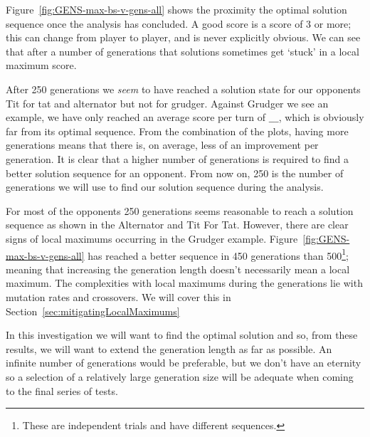Figure~\ref{fig:GENS-max-bs-v-gens-all} shows the proximity the optimal solution sequence once the analysis has concluded.
A good score is a score of 3 or more;
this can change from player to player, and is never explicitly obvious.
We can see that after a number of generations that solutions sometimes get `stuck' in a local maximum score.


After 250 generations we \textit{seem} to have reached a solution state for our opponents Tit for tat and alternator but not for grudger.
Against Grudger we see an example, we have only reached an average score per turn of $\_\_\_$, which is obviously far from its optimal sequence.
From the combination of the plots, having more generations means that there is, on average, less of an improvement per generation.
It is clear that a higher number of generations is required to find a better solution sequence for an opponent.
From now on, 250 is the number of generations we will use to find our solution sequence during the analysis.

For most of the opponents 250 generations seems reasonable to reach a solution sequence as shown in the Alternator and Tit For Tat.
However, there are clear signs of local maximums occurring in the Grudger example.
Figure~\ref{fig:GENS-max-bs-v-gens-all} has reached a better sequence in 450 generations than 500\footnote{These are independent trials and have different sequences.}; meaning that increasing the generation length doesn't necessarily mean a local maximum.
The complexities with local maximums during the generations lie with mutation rates and crossovers.
We will cover this in Section~\ref{sec:mitigatingLocalMaximums}

In this investigation we will want to find the optimal solution and so, from these results, we will want to extend the generation length as far as possible.
An infinite number of generations would be preferable, but we don't have an eternity so a selection of a relatively large generation size will be adequate when coming to the final series of tests.

